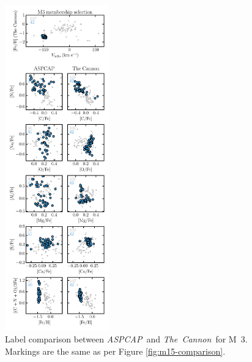 \documentclass[12pt,preprint]{aastex}
\newcommand{\project}[1]{\textsl{#1}}
\newcommand{\TheCannon}{\project{The~Cannon}}
\newcommand{\acronym}[1]{{\small{#1}}}
\newcommand{\aspcap}{\project{\acronym{ASPCAP}}}
\begin{document}
\begin{figure}[p]
\includegraphics[width=0.4\textwidth]{M3_comparison.pdf}
\caption{Label comparison between \aspcap\ and \TheCannon\ for M~3.
Markings are the same as per Figure \ref{fig:m15-comparison}.
\label{fig:m3-comparison}}
\end{figure}

\clearpage
\end{document}
